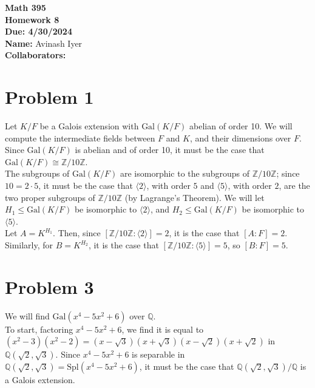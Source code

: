 \documentclass[10pt]{extarticle}
\title{}
\author{}
\date{}
\newcommand{\Q}{\mathbb{Q}}
\newcommand{\Z}{\mathbb{Z}}
\begin{document}
  \begin{center}
    {\bf \Large Math 395 \\[0.1in]Homework 8 \\[0.1in]
    Due: 4/30/2024}\\[.25in]
    {\bf Name:} {Avinash Iyer}\\[0.15in]
    {\bf Collaborators:} {} \\
  \end{center}
  \section{Problem 1}%
  Let $K/F$ be a Galois extension with $\text{Gal}(K/F)$ abelian of order 10. We will compute the intermediate fields between $F$ and $K$, and their dimensions over $F$.\\

  Since $\text{Gal}(K/F)$ is abelian and of order 10, it must be the case that $\text{Gal}(K/F)\cong \Z/10\Z$.\\

  The subgroups of $\text{Gal}(K/F)$ are isomorphic to the subgroups of $\Z/10\Z$; since $10 = 2\cdot 5$, it must be the case that $\langle 2 \rangle$, with order $5$ and $\langle 5 \rangle$, with order $2$, are the two proper subgroups of $\Z/10\Z$ (by Lagrange's Theorem). We will let $H_1 \leq \text{Gal}(K/F)$ be isomorphic to $\langle 2 \rangle$, and $H_2 \leq \text{Gal}(K/F)$ be isomorphic to $\langle 5 \rangle$.\\

  Let $A = K^{H_1}$. Then, since $[\Z/10\Z : \langle 2 \rangle] = 2$, it is the case that $[A:F] = 2$. Similarly, for $B = K^{H_2}$, it is the case that $[\Z/10\Z : \langle 5 \rangle] = 5$, so $[B:F] = 5$.
  \section{Problem 3}%
  We will find $\text{Gal}(x^4 - 5x^2 + 6)$ over $\Q$.\\

  To start, factoring $x^4 - 5x^2 + 6$, we find it is equal to $(x^2 - 3)(x^2 - 2) = (x-\sqrt{3})(x+\sqrt{3})(x-\sqrt{2})(x+\sqrt{2})$ in $\Q(\sqrt{2},\sqrt{3})$. Since $x^4 - 5x^2 + 6$ is separable in $\Q(\sqrt{2},\sqrt{3}) = \text{Spl}(x^4 - 5x^2 + 6)$, it must be the case that $\Q(\sqrt{2},\sqrt{3})/\Q$ is a Galois extension.\\
\end{document}
